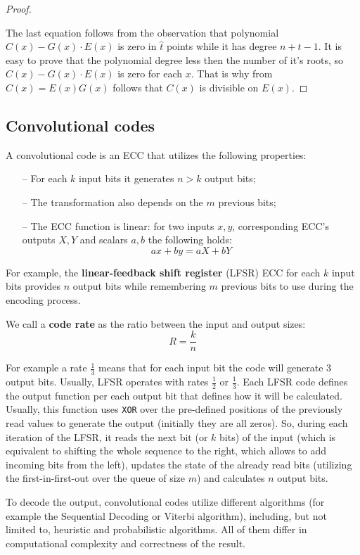 \documentclass[../lecture-notes.tex]{subfiles}
\begin{document}
\begin{proof}
\begin{tcolorbox}
\end{tcolorbox}
The last equation follows from the observation that polynomial $C(x) - G(x)\cdot E(x)$ is zero in $\hat{t}$ points 
while it has degree $n + t - 1$. It is easy to prove that the polynomial degree less then the number of it's roots, 
so $C(x) - G(x)\cdot E(x)$ is zero for each $x$. That is why from $C(x) = E(x)G(x)$ follows that $C(x)$ is divisible 
on $E(x)$.
\end{proof}

\subsection{Convolutional codes}
A convolutional code is an ECC that utilizes the following properties:
\begin{enumerate}
\item[--] For each $k$ input bits it generates $n>k$ output bits;
\item[--] The transformation also depends on the $m$ previous bits;
\item[--] The ECC function is linear: for two inputs $x, y$, corresponding ECC's outputs $X, Y$ and scalars $a,b$ the 
following holds: 
\begin{equation*}
    ax + by = aX + bY
\end{equation*}
\end{enumerate}
For example, the \textbf{linear-feedback shift register} (LFSR) ECC for each $k$ input bits provides $n$ output bits 
while remembering $m$ previous bits to use during the encoding process.
\begin{definition}
 We call a \textbf{code rate} as the ratio between the input and output sizes:
\begin{equation*}
    R = \frac{k}{n}
\end{equation*}
\end{definition}
For example a rate $\frac{1}{3}$ means that for each input bit the code will generate $3$ output bits. Usually, LFSR 
operates with rates $\frac{1}{2}$ or $\frac{1}{3}$. Each LFSR code defines the output function per each output bit that 
defines how it will be calculated. Usually, this function uses \verb|XOR| over the pre-defined positions of the 
previously read values to generate the output (initially they are all zeros). So, during each iteration of the LFSR, 
it reads the next bit (or $k$ bits) of the input (which is equivalent to shifting the whole sequence to the right, 
which allows to add incoming bits from the left), updates the state of the already read bits (utilizing the 
first-in-first-out over the queue of size $m$) and calculates $n$ output bits.

To decode the output, convolutional codes utilize different algorithms (for example the Sequential Decoding or Viterbi 
algorithm), including, but not limited to, heuristic and probabilistic algorithms. All of them differ in computational 
complexity and correctness of the result.
\end{document}

